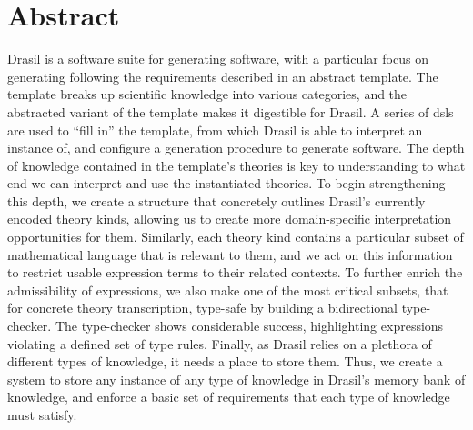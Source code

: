 \chapter{Abstract}
\label{chap:abstract}

Drasil is a software suite for generating software, with a particular focus on
generating  following the requirements described in an abstract
 template. The template breaks up scientific knowledge into various
categories, and the abstracted variant of the template makes it digestible for
Drasil. A series of \acsp{dsl} are used to ``fill in'' the template, from which
Drasil is able to interpret an instance of, and configure a generation procedure
to generate software. The depth of knowledge contained in the template's
theories is key to understanding to what end we can interpret and use the
instantiated theories. To begin strengthening this depth, we create a structure
that concretely outlines Drasil's currently encoded theory kinds, allowing us to
create more domain-specific interpretation opportunities for them. Similarly,
each theory kind contains a particular subset of mathematical language that is
relevant to them, and we act on this information to restrict usable expression
terms to their related contexts. To further enrich the admissibility of
expressions, we also make one of the most critical subsets, that for concrete
theory transcription, type-safe by building a bidirectional type-checker. The
type-checker shows considerable success, highlighting expressions violating a
defined set of type rules. Finally, as Drasil relies on a plethora of different
types of knowledge, it needs a place to store them. Thus, we create a system to
store any instance of any type of knowledge in Drasil's memory bank of
knowledge, and enforce a basic set of requirements that each type of knowledge
must satisfy.
